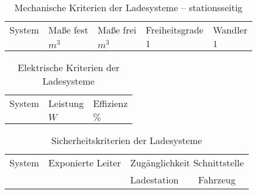 \begin{table}\centering
	\begin{tabularx}{\linewidth}{Xllll}
		\toprule
		System & Maße fest & Maße frei & Freiheitsgrade & Wandler \\
		& $m^3$     & $m^3$     & $1$            & $1$     \\ \midrule
	\end{tabularx}
	\caption{Mechanische Kriterien der Ladesysteme – stationsseitig}
	\label{tab_mech_Ladesys_stat}
\end{table}

\begin{table}\centering
	\begin{tabularx}{\linewidth}{XXX}
		\toprule
		System & Leistung & Effizienz \\
		       & $W$      & $\%$       \\ \midrule
	\end{tabularx}
	\caption{Elektrische Kriterien der Ladesysteme}
	\label{tab_el_Ladesys}
\end{table}

\begin{table}\centering
	\begin{tabularx}{\linewidth}{XXXX}
		\toprule
		System         & Exponierte Leiter & \multicolumn{2}{c}{Zugänglichkeit Schnittstelle} \\
		\cmidrule{3-4} &           & Ladestation & Fahrzeug \\ \midrule
	\end{tabularx}
	\caption{Sicherheitskriterien der Ladesysteme}
	\label{tab_sich_Ladesys}
\end{table}